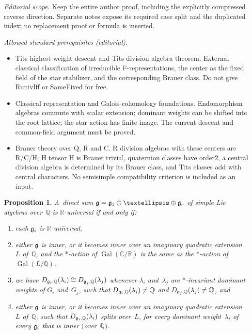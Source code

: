 \documentclass[10pt,a4paper]{amsart}
\DeclareMathOperator{\Gal}{Gal}
\numberwithin{equation}{section}
\newtheorem{prop}{Proposition}[section]
\newcommand{\Lie}[1]{\mathfrak{\lowercase{#1}}}
\begin{document}
\noindent\textit{Editorial scope.} Keep the entire author proof, including the explicitly compressed reverse direction. Separate notes expose its required case split and the duplicated index; no replacement proof or formula is inserted.\par\medskip
\noindent\textit{Allowed standard prerequisites (editorial).}\begin{itemize}
\item Tits highest-weight descent and Tits division algebra theorem. External classical classification of irreducible F-representations, the center as the fixed field of the star stabilizer, and the corresponding Brauer class. Do not give RunivIff or SameFixed for free.
\item Classical representation and Galois-cohomology foundations. Endomorphism algebras commute with scalar extension; dominant weights can be shifted into the root lattice; the star action has finite image. The current descent and common-field argument must be proved.
\item Brauer theory over Q, R and C. R division algebras with these centers are R/C/H; H tensor H is Brauer trivial, quaternion classes have order2, a central division algebra is determined by its Brauer class, and Tits classes add with central characters. No semisimple compatibility criterion is included as an input.
\end{itemize}\medskip
\begin{prop}
A~direct sum $\Lie G = \Lie G_1 \oplus \dots \oplus \Lie G_r$ of simple Lie algebras over~$\mathbb{Q}$ is
$\mathbb{R}$-universal if and only if:
\renewcommand{\labelenumi}{{\rm (\theenumi)}}
\begin{enumerate}\itemsep=0pt
\item
\label{SS-Gi}
each $\Lie G_i$ is $\mathbb{R}$-universal,
\item
\label{SS-star}
either $\Lie G$ is inner, or it becomes inner over an imaginary quadratic extension~$L$ of~$\mathbb{Q}$, and the
$*$-action of $\Gal(\mathbb{C}/\mathbb{R})$ is the same as the $*$-action of $\Gal(L/\mathbb{Q})$.
\item
\label{SS-Di=Dj}
we have $D_{\Lie G_i, \mathbb{Q}}(\lambda_i) \cong D_{\Lie G_j, \mathbb{Q}}(\lambda_j)$ whenever $\lambda_i$
and~$\lambda_j$ are $*$-invariant dominant weights of $G_i$ and~$G_j$, such that $D_{\Lie G_i, \mathbb{Q}}(\lambda_i)
\neq \mathbb{Q}$ and $D_{\Lie G_j, \mathbb{Q}}(\lambda_j) \neq \mathbb{Q}$, and
\item
\label{SS-Dsplit}
either $\Lie G$ is inner, or it becomes inner over an imaginary quadratic extension~$L$ of~$\mathbb{Q}$, such that
$D_{\Lie G_i, \mathbb{Q}}(\lambda_i)$ splits over~$L$, for every dominant weight~$\lambda_i$ of every $\Lie G_i$ that is
inner $($over~$\mathbb{Q})$.
\end{enumerate}
\end{prop}
\end{document}
